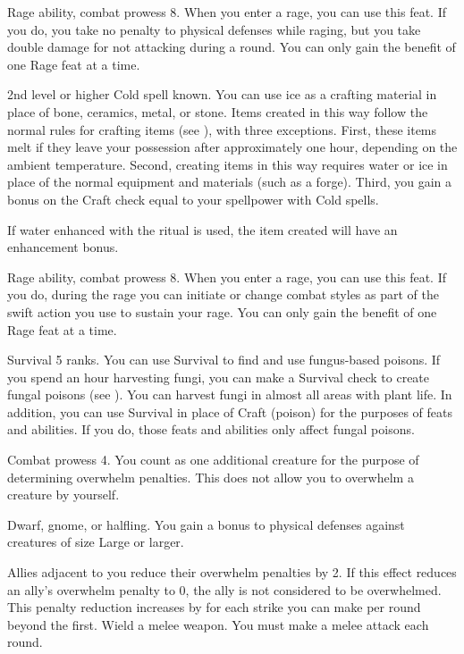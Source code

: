 \featpres Rage ability, combat prowess 8.
\featben When you enter a rage, you can use this feat. If you do, you take no penalty to physical defenses while raging, but you take double damage for not attacking during a round.
 You can only gain the benefit of one Rage feat at a time.

\featpre 2nd level or higher Cold spell known.
\featben You can use ice as a crafting material in place of bone, ceramics, metal, or stone.
Items created in this way follow the normal rules for crafting items (see ), with three exceptions.
First, these items melt if they leave your possession after approximately one hour, depending on the ambient temperature.
Second, creating items in this way requires water or ice in place of the normal equipment and materials (such as a forge).
Third, you gain a bonus on the Craft check equal to your spellpower with Cold spells.

If water enhanced with the  ritual is used, the item created will have an enhancement bonus.

\featpres Rage ability, combat prowess 8.
\featben When you enter a rage, you can use this feat. If you do, during the rage you can initiate or change combat styles as part of the swift action you use to sustain your rage.
 You can only gain the benefit of one Rage feat at a time.

\featpre Survival 5 ranks.
\featben You can use Survival to find and use fungus-based poisons.
If you spend an hour harvesting fungi, you can make a Survival check to create fungal poisons (see ).
You can harvest fungi in almost all areas with plant life.
In addition, you can use Survival in place of Craft (poison) for the purposes of feats and abilities.
If you do, those feats and abilities only affect fungal poisons.

\featpre Combat prowess 4.
\featben You count as one additional creature for the purpose of determining overwhelm penalties.
This does not allow you to overwhelm a creature by yourself.

\featpres Dwarf, gnome, or halfling.
\featben You gain a  bonus to physical defenses against creatures of size Large or larger.

\featben Allies adjacent to you reduce their overwhelm penalties by 2.
If this effect reduces an ally's overwhelm penalty to 0, the ally is not considered to be overwhelmed.
This penalty reduction increases by  for each strike you can make per round beyond the first.
\stylereq Wield a melee weapon.
You must make a melee attack each round.

